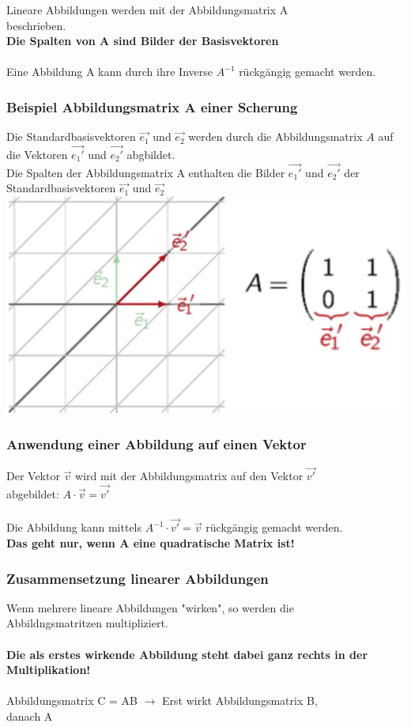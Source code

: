			Lineare Abbildungen werden mit der Abbildungsmatrix A \\
			beschrieben. \\		
			\textbf{Die Spalten von A sind Bilder der Basisvektoren} \\
			\\
			Eine Abbildung A kann durch ihre Inverse $A^{-1}$ rückgängig gemacht werden.
			
			
			
			
			\subsubsection{Beispiel Abbildungsmatrix A einer Scherung}
			Die Standardbasisvektoren $\vec{e_1}$ und $\vec{e_2}$ werden durch die Abbildungsmatrix $A$ auf die Vektoren $\vec{e_1'}$ und $\vec{e_2'}$ abgbildet. \\
			Die Spalten der Abbildungsmatrix A enthalten die Bilder $\vec{e_1'}$ und $\vec{e_2'}$ der Standardbasisvektoren 	$\vec{e_1}$ und $\vec{e_2}$ \\

			\includegraphics[width=0.5\linewidth]{Bilder/scherung}
			\subsubsection{Anwendung einer Abbildung auf einen Vektor}
			Der Vektor $\vec{v}$ wird mit der Abbildungsmatrix auf den Vektor $\vec{v'}$\\
			abgebildet: $A \cdot \vec{v} = \vec{v'}$ \\		
			\\		
			Die Abbildung kann mittels $A^{-1} \cdot \vec{v'} = \vec{v}$ rückgängig gemacht werden. \\
			\textbf{Das geht nur, wenn A eine quadratische Matrix ist!}

		  	\subsubsection{Zusammensetzung linearer Abbildungen}
		  	Wenn mehrere lineare Abbildungen "wirken", so werden die \\
		  	Abbildngsmatritzen multipliziert. \\
		  	\\
		  	\textbf{Die als erstes wirkende Abbildung steht dabei ganz rechts in der Multiplikation!}\\
		  	\\
		  	Abbildungsmatrix C = AB $\rightarrow$ Erst wirkt Abbildungsmatrix B,\\ 
		  	danach A
		  	

